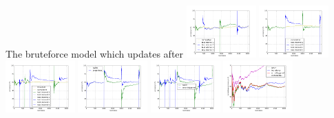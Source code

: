 \documentclass[a0,portrait]{a0poster}
\begin{document}
{{The bruteforce model which updates after 
   \includegraphics[width=0.2\textwidth]{./plots/bruteforcePlot.png}
   \includegraphics[width=0.2\textwidth]{./plots/bruteforce2_Plot.png}
   \includegraphics[width=0.2\textwidth]{./plots/errorTriggeredPlot}
   \includegraphics[width=0.2\textwidth]{./plots/bruteforce_batch}
\includegraphics[width=0.2\textwidth]{./plots/errortriggered_batch}
   \includegraphics[width=0.2\textwidth]{./plots/allAccuracies}
\\
}}

\vspace{0.8cm}
\end{document}
